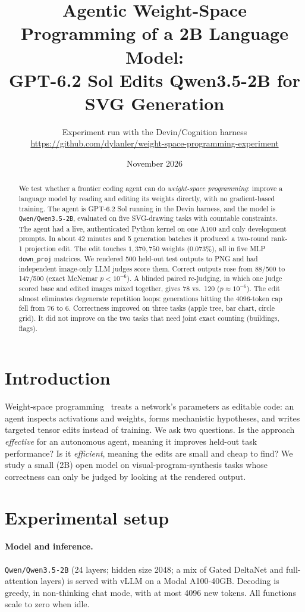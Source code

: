 \documentclass[11pt]{article}
\title{Agentic Weight-Space Programming of a 2B Language Model:\\GPT-6.2 Sol Edits Qwen3.5-2B for SVG Generation}
\author{Experiment run with the Devin/Cognition harness\\\small\url{https://github.com/dylanler/weight-space-programming-experiment}}
\date{November 2026}
\begin{document}
\maketitle

\begin{abstract}
We test whether a frontier coding agent can do \emph{weight-space programming}: improve a language model by reading and editing its weights directly, with no gradient-based training. The agent is GPT-6.2 Sol running in the Devin harness, and the model is \texttt{Qwen/Qwen3.5-2B}, evaluated on five SVG-drawing tasks with countable constraints.
The agent had a live, authenticated Python kernel on one A100 and only development prompts. In about 42 minutes and 5 generation batches it produced a two-round rank-1 projection edit. The edit touches $1{,}370{,}750$ weights ($0.073\%$), all in five MLP \texttt{down\_proj} matrices.
We rendered 500 held-out test outputs to PNG and had independent image-only LLM judges score them. Correct outputs rose from 88/500 to 147/500 (exact McNemar $p<10^{-6}$). A blinded paired re-judging, in which one judge scored base and edited images mixed together, gives 78 vs.\ 120 ($p\approx10^{-6}$).
The edit almost eliminates degenerate repetition loops: generations hitting the 4096-token cap fell from 76 to 6. Correctness improved on three tasks (apple tree, bar chart, circle grid). It did not improve on the two tasks that need joint exact counting (buildings, flags).
\end{abstract}

\section{Introduction}
Weight-space programming~\cite{wsp} treats a network's parameters as editable code: an agent inspects activations and weights, forms mechanistic hypotheses, and writes targeted tensor edits instead of training. We ask two questions. Is the approach \emph{effective} for an autonomous agent, meaning it improves held-out task performance? Is it \emph{efficient}, meaning the edits are small and cheap to find?
We study a small (2B) open model on visual-program-synthesis tasks whose correctness can only be judged by looking at the rendered output.

\section{Experimental setup}
\paragraph{Model and inference.} \texttt{Qwen/Qwen3.5-2B} (24 layers; hidden size 2048; a mix of Gated DeltaNet and full-attention layers) is served with vLLM on a Modal A100-40GB. Decoding is greedy, in non-thinking chat mode, with at most 4096 new tokens. All functions scale to zero when idle.
\end{document}
